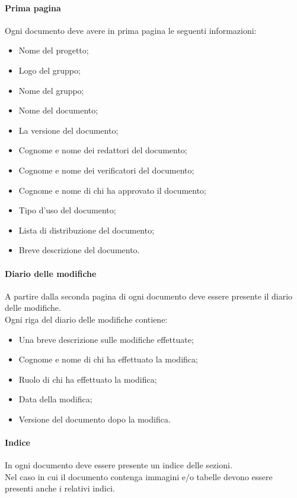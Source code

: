 \paragraph{Prima pagina}
Ogni documento deve avere in prima pagina le seguenti informazioni:
\begin{itemize}
	\item Nome del progetto;
	\item Logo del gruppo;
	\item Nome del gruppo;
	\item Nome del documento;
	\item La versione del documento;
	\item Cognome e nome dei redattori del documento;
	\item Cognome e nome dei verificatori del documento;
	\item Cognome e nome di chi ha approvato il documento;
	\item Tipo d'uso del documento;
	\item Lista di distribuzione del documento;
	\item Breve descrizione del documento.
\end{itemize}
\paragraph{Diario delle modifiche}
A partire dalla seconda pagina di ogni documento deve essere presente il diario delle modifiche.\\
Ogni riga del diario delle modifiche contiene:
\begin{itemize}
	\item Una breve descrizione sulle modifiche effettuate;
	\item Cognome e nome di chi ha effettuato la modifica;
	\item Ruolo di chi ha effettuato la modifica;
	\item Data della modifica;
	\item Versione del documento dopo la modifica.
\end{itemize}

\paragraph{Indice}
In ogni documento deve essere presente un indice delle sezioni.\\
Nel caso in cui il documento contenga immagini e/o tabelle devono essere presenti anche i relativi indici.

